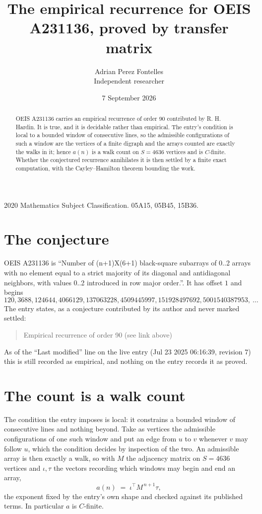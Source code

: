 \documentclass[11pt,a4paper]{article}
\title{The empirical recurrence for OEIS A231136, proved by transfer matrix}
\author{Adrian Perez Fontelles\\ \small Independent researcher}
\date{7 September 2026}
\theoremstyle{plain}
\theoremstyle{definition}
\begin{document}
\maketitle

\begin{abstract}
OEIS A231136 carries an empirical recurrence of order $90$ contributed by R. H. Hardin. It is
true, and it is decidable rather than empirical. The entry's condition is local to a bounded window of consecutive lines, so
the admissible configurations of such a window are the vertices of a finite digraph and the
arrays counted are exactly the walks in it; hence $a(n)$ is a walk count on $S=4636$ vertices
and is $C$-finite. Whether the conjectured recurrence annihilates it is then settled by a
finite exact computation, with the Cayley--Hamilton theorem bounding the work.
\end{abstract}

\noindent\small 2020 Mathematics Subject Classification. 05A15, 05B45, 15B36.\normalsize

\section{The conjecture}

OEIS A231136 is ``Number of (n+1)X(6+1) black-square subarrays of 0..2 arrays with no element equal to a strict majority of its diagonal and antidiagonal neighbors, with values 0..2 introduced in row major order.''. It has offset $1$ and begins
\[
120, 3688, 124644, 4066129, 137063228, 4509445997, 151928497692, 5001540387953,\ \dots
\]
The entry states, as a conjecture contributed by its author and never marked settled:
\begin{quote}
Empirical recurrence of order 90 (see link above)
\end{quote}
As of the ``Last modified'' line on the live entry (Jul 23 2025 06:16:39, revision 7) this is still
recorded as empirical, and nothing on the entry records it as proved.

\section{The count is a walk count}

The condition the entry imposes is local: it constrains a bounded window of consecutive lines and nothing beyond. Take as
vertices the admissible configurations of one such window and put an edge from $u$ to $v$
whenever $v$ may follow $u$, which the condition decides by inspection of the two. An
admissible array is then exactly a walk, so with $M$ the adjacency matrix on $S=4636$ vertices
and $\iota,\tau$ the vectors recording which windows may begin and end an array,
\[
a(n)\;=\;\iota^{\!\top}M^{\,n+1}\tau ,
\]
the exponent fixed by the entry's own shape and checked against its published terms. In
particular $a$ is $C$-finite.
\end{document}
